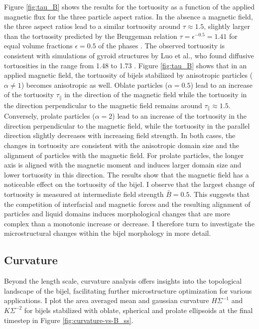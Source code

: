Figure \ref{fig:tau_B} shows the results for the tortuosity as a
function of the applied magnetic flux for the three particle aspect
ratios. In the absence a magnetic field, the three aspect ratios lead to
a similar tortuosity around $\tau\approx 1.5$, slightly larger than
the tortuosity predicted by the Bruggeman relation
\(\tau=\epsilon^{-0.5}=1.41\) for equal volume fractions
\(\epsilon=0.5\) of the phases
\cite{bruggeman1935tortuosity, tjaden_origin_2016}. The observed
tortuosity is consistent with simulations of gyroid structures by Luo et
al., who found diffusive tortuosities in the range from 1.48 to 1.73
\cite{luo_macroscopic_2020}. Figure \ref{fig:tau_B} shows that in an
applied magnetic field, the tortuosity of bijels stabilized by
anisotropic particles (\(\alpha\neq1\)) becomes anisotropic as well.
Oblate particles (\(\alpha=0.5\)) lead to an increase of the tortuosity
\(\tau_\parallel\) in the direction of the magnetic field while the
tortuosity in the direction perpendicular to the magnetic field remains
around \(\tau_\parallel\approx1.5\). Conversely, prolate particles
(\(\alpha=2\)) lead to an increase of the tortuosity in the direction
perpendicular to the magnetic field, while the tortuosity in the
parallel direction slightly decreases with increasing field strength. In
both cases, the changes in tortuosity are consistent with the
anisotropic domain size and the alignment of particles with the magnetic
field. For prolate particles, the longer axis is aligned with the
magnetic moment and induces larger domain size and lower tortuosity in
this direction. The results show that the magnetic field has a
noticeable effect on the tortuosity of the bijel. I observe that the
largest change of tortuosity is measured at intermediate field strength
\(\bar{B}=0.5\). This suggests that the competition of interfacial and
magnetic forces and the resulting alignment of particles and liquid
domains induces morphological changes that are more complex than a
monotonic increase or decrease. I therefore turn to investigate the
microstructural changes within the bijel morphology in more detail.

\subsection{Curvature}

Beyond the length scale, curvature analysis offers insights into the
topological landscape of the bijel, facilitating further
microstructure optimization for various applications.
\cite{reeves_quantitative_2016} I plot the area averaged mean and
gaussian curvature \(H\Sigma^{-1}\) and \(K\Sigma^{-2}\) for bijels
stabilized with oblate, spherical and prolate ellipsoids at the final timestep in Figure
\ref{fig:curvature-vs-B_ss}. 

